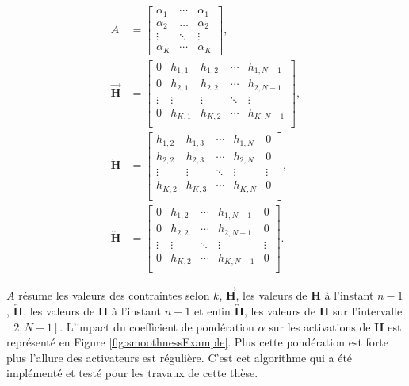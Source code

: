 \begin{subequations}
\begin{align}
    A &= 
\begin{bmatrix} 
\alpha_1 &  \cdots & \alpha_1  \\ 
\alpha_2 & \dots & \alpha_2  \\ 
\vdots & \ddots &  \vdots \\
\alpha_K & \cdots & \alpha_K
\end{bmatrix}, \label{eq:subeq1}\\
    \overrightarrow{\mathbf{H}} &= 
\begin{bmatrix}
0 & h_{1,1} & h_{1,2} & \cdots & h_{1,N-1}\\
0 & h_{2,1} & h_{2,2} & \cdots & h_{2,N-1}\\
\vdots & \vdots & \vdots & \ddots & \vdots\\
0 & h_{K,1} & h_{K,2} & \cdots & h_{K,N-1}\\
\end{bmatrix}, \label{eq:subeq2}\\
    \overleftarrow{\mathbf{H}} &= 
\begin{bmatrix}
h_{1,2} & h_{1,3} & \cdots & h_{1,N} & 0\\
h_{2,2} & h_{2,3} & \cdots & h_{2,N} & 0\\
\vdots & \vdots & \ddots & \vdots & \vdots\\
h_{K,2} & h_{K,3} & \cdots & h_{K,N} & 0\\
\end{bmatrix}, \label{eq:subeq3}\\
    \overleftrightarrow{\mathbf{H}} &= 
\begin{bmatrix}
0 & h_{1,2} & \cdots & h_{1,N-1} & 0\\
0 & h_{2,2} & \cdots & h_{2,N-1} & 0\\
\vdots & \vdots & \ddots & \vdots & \vdots\\
0 & h_{K,2} & \cdots & h_{K,N-1} & 0\\
\end{bmatrix}. \label{eq:subeq5}
\end{align}
\end{subequations}

$A$ résume les valeurs des contraintes selon $k$, $\overrightarrow{\mathbf{H}}$, les valeurs de $\mathbf{H}$ à l'instant $n-1$, $\overleftarrow{\mathbf{H}}$, les valeurs de $\mathbf{H}$ à l'instant $n+1$ et enfin $\overleftrightarrow{\mathbf{H}}$, les valeurs de $\mathbf{H}$ sur l'intervalle $\left[2,N-1 \right]$. L'impact du coefficient de pondération $\alpha$ sur les activations de $\mathbf{H}$ est représenté en Figure \ref{fig:smoothnessExample}. Plus cette pondération est forte plus l'allure des activateurs est régulière. C'est cet algorithme qui a été implémenté et testé pour les travaux de cette thèse.

